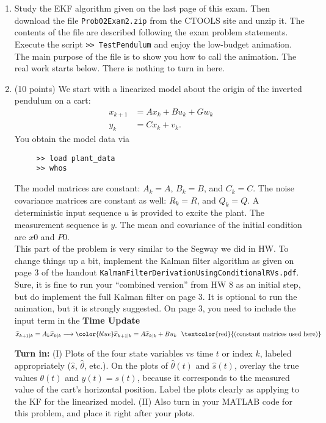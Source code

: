 \documentclass[letterpaper]{article}
\begin{document}
\begin{enumerate}
\begin{enumerate}
\setlength{\itemsep}{.1in}
\renewcommand{\labelenumi}{(\alph{enumi})}
\item Study the EKF algorithm given on the last page of this exam. Then download the file \texttt{Prob02Exam2.zip} from the CTOOLS site and unzip it. The contents of the file are described following the exam problem statements. Execute the script \texttt{>> TestPendulum} and enjoy the low-budget animation. The main purpose of the file is to show you how to call the animation. The real work starts below. There is nothing to turn in here.

 \item  (10 points) We start with a linearized model about the origin of the inverted pendulum on a cart:
     \begin{align*}
          x_{k+1} &= Ax_k + Bu_k + Gw_k \\
y_k &= Cx_k + v_k.
     \end{align*}
You obtain the model data via
     \begin{verbatim}
     >> load plant_data
     >> whos
     \end{verbatim}
The model matrices are constant: $A_k=A$, $B_k=B$, and $C_k=C$. The noise covariance matrices are constant as well: $R_k = R$, and $Q_k = Q$. A deterministic input sequence $u$ is provided to excite the plant. The measurement sequence is $y$. The mean and covariance of the initial condition are $x0$ and $P0$.\\

This part of the problem is very similar to the Segway we did in HW. To change things up a bit, implement the Kalman filter algorithm as given on page 3 of the handout \texttt{KalmanFilterDerivationUsingConditionalRVs.pdf}. Sure, it is fine to run your ``combined version'' from HW 8 as an initial step, but do implement the full Kalman filter on page 3. It is optional to run the animation, but it is strongly suggested. On page 3, you need to include the input term in the \textbf{Time Update}\\
$$ \widehat{x}_{k+1|k} = A_k \widehat{x}_{k|k} \longrightarrow \color{blue}\widehat{x}_{k+1|k} = A \widehat{x}_{k|k}  + B u_k~~\text{\textcolor{red}{(constant matrices used here)}}$$

\noindent \textbf{Turn in:} (I) Plots of the four state variables vs time $t$ or index $k$, labeled appropriately ($\widehat{s}$, $\widehat{\theta}$, etc.).  On the plots of $\widehat{\theta}(t)$ and $\widehat{s}(t)$, overlay the true values $\theta(t)$ and $y(t)=s(t)$, because it corresponds to the measured value of the cart's horizontal position. Label the plots clearly as applying to the KF for the linearized model. (II) Also turn in your MATLAB code for this problem, and place it right after your plots.


\end{enumerate}
\end{enumerate}
\end{document}

